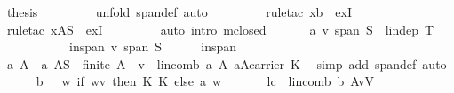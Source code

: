 \begin{isabellebody}
\ {\isacharquery}thesis\ \isanewline
\ \ \ \ \ \ \isamarkupfalse%
\ {\isacharparenleft}unfold\ span{\isacharunderscore}def{\isacharcomma}\ auto{\isacharparenright}\ \isanewline
\ \ \ \ \ \ \isamarkupfalse%
\ {\isacharparenleft}rule{\isacharunderscore}tac\ x{\isacharequal}{\isachardoublequoteopen}{\isacharquery}b{\isachardoublequoteclose}\ \ exI{\isacharparenright}\isanewline
\ \ \ \ \ \ \isamarkupfalse%
\ {\isacharparenleft}rule{\isacharunderscore}tac\ x{\isacharequal}{\isachardoublequoteopen}A{\isasyminter}S{\isachardoublequoteclose}\ \ exI{\isacharparenright}\ \isanewline
\ \ \ \ \ \ \isamarkupfalse%
\ {\isacharparenleft}auto\ intro{\isacharbang}{\isacharcolon}\ m{\isacharunderscore}closed{\isacharparenright}\isanewline
\ \ \isamarkupfalse%
\isanewline
\ \ \isamarkupfalse%
\ a{}{\isacharcolon}\ {\isachardoublequoteopen}v{\isasymin}\ {\isacharparenleft}span\ S{\isacharparenright}\ {\isasymLongrightarrow}\ lin{\isacharunderscore}dep\ {\isacharquery}T{\isachardoublequoteclose}\isanewline
\ \ \isamarkupfalse%
\ {\isacharminus}\ \isanewline
\ \ \ \ \isamarkupfalse%
\ inspan{\isacharcolon}\ {\isachardoublequoteopen}v{\isasymin}\ {\isacharparenleft}span\ S{\isacharparenright}{\isachardoublequoteclose}\isanewline
\ \ \ \ \isamarkupfalse%
\ inspan\ \isamarkupfalse%
\ a\ A\ \ a{\isacharcolon}\ {\isachardoublequoteopen}A{\isasymsubseteq}S\ {\isasymand}\ finite\ A\ {\isasymand}\ {\isacharparenleft}v\ {\isacharequal}\ lincomb\ a\ A{\isacharparenright}{\isasymand}\ a{\isasymin}A{\isasymrightarrow}carrier\ K{\isachardoublequoteclose}\ \isamarkupfalse%
\ {\isacharparenleft}simp\ add{\isacharcolon}\ span{\isacharunderscore}def{\isacharcomma}\ auto{\isacharparenright}\isanewline
\ \ \ \ \isamarkupfalse%
\ {\isacharquery}b\ {\isacharequal}\ {\isachardoublequoteopen}{\isasymlambda}\ w{\isachardot}\ if\ {\isacharparenleft}w{\isacharequal}v{\isacharparenright}\ then\ {\isacharparenleft}{\isasymominus}\isactrlbsub K\isactrlesub \ {\isasymone}\isactrlbsub K\isactrlesub {\isacharparenright}\ else\ a\ w{\isachardoublequoteclose}\ \isanewline
\ \ \ \ \isamarkupfalse%
\ lc{}{\isacharcolon}\ {\isachardoublequoteopen}\ lincomb\ {\isacharquery}b\ {\isacharparenleft}A{\isasymunion}{\isacharbraceleft}v{\isacharbraceright}{\isacharparenright}{\isacharequal}{\isasymzero}\isactrlbsub V\isactrlesub {\isachardoublequoteclose}\ \isanewline

\end{isabellebody}
